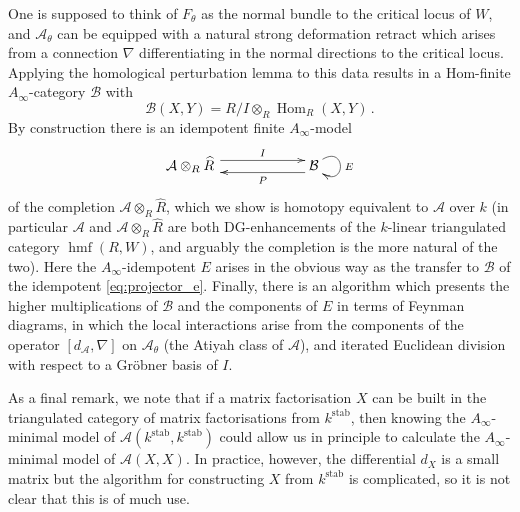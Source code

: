 \documentclass[english,letter paper,12pt,leqno]{article}
\theoremstyle{example}
\numberwithin{equation}{section}
\def\AA{\mathcal{A}}
\def\BB{\mathcal{B}}
\def\stab{\operatorname{stab}}
\def\Hom{\operatorname{Hom}}
\DeclareMathOperator{\hmf}{hmf}
\begin{document}
One is supposed to think of $F_\theta$ as the normal bundle to the critical locus of $W$, and $\AA_\theta$ can be equipped with a natural strong deformation retract which arises from a connection $\nabla$ differentiating in the normal directions to the critical locus. Applying the homological perturbation lemma to this data results in a Hom-finite $A_\infty$-category $\BB$ with
\[
\BB(X,Y) = R/I \otimes_R \Hom_R(X,Y)\,.
\]
By construction there is an idempotent finite $A_\infty$-model
\[
\xymatrix@C+3pc{
\AA \otimes_R \widehat{R}\, \ar@<1ex>[r]^-I & \mathcal{B} \ar@(ur,dr)^E \ar@<1ex>[l]^-P
}
\]
of the completion $\AA \otimes_R \widehat{R}$, which we show is homotopy equivalent to $\AA$ over $k$ (in particular $\AA$ and $\AA \otimes_R \widehat{R}$ are both DG-enhancements of the $k$-linear triangulated category $\hmf(R,W)$, and arguably the completion is the more natural of the two). Here the $A_\infty$-idempotent $E$ arises in the obvious way as the transfer to $\BB$ of the idempotent \eqref{eq:projector_e}. Finally, there is an algorithm which presents the higher multiplications of $\BB$ and the components of $E$ in terms of Feynman diagrams, in which the local interactions arise from the components of the operator $[d_{\AA}, \nabla]$ on $\AA_{\theta}$ (the Atiyah class of $\AA$), and iterated Euclidean division with respect to a Gr\"obner basis of $I$.

As a final remark, we note that if a matrix factorisation $X$ can be built in the triangulated category of matrix factorisations from $k^{\stab}$, then knowing the $A_\infty$-minimal model of $\AA(k^{\stab},k^{\stab})$ could allow us in principle to calculate the $A_\infty$-minimal model of $\AA(X,X)$. In practice, however, the differential $d_X$ is a small matrix but the algorithm for constructing $X$ from $k^{\stab}$ is complicated, so it is not clear that this is of much use.

\end{document}
